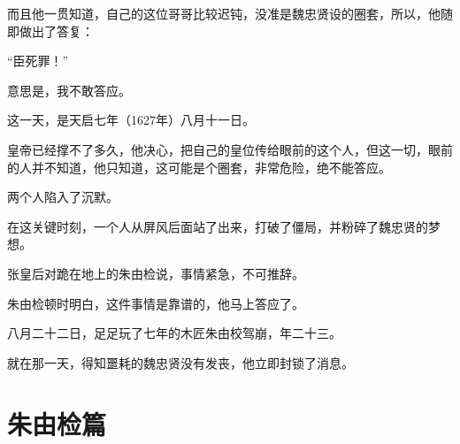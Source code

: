 \begin{multicols}{\theparacolNo}
		而且他一贯知道，自己的这位哥哥比较迟钝，没准是魏忠贤设的圈套，所以，他随即做出了答复：

		“臣死罪！”

		意思是，我不敢答应。

		这一天，是天启七年（1627年）八月十一日。

		皇帝已经撑不了多久，他决心，把自己的皇位传给眼前的这个人，但这一切，眼前的人并不知道，他只知道，这可能是个圈套，非常危险，绝不能答应。

		两个人陷入了沉默。

		在这关键时刻，一个人从屏风后面站了出来，打破了僵局，并粉碎了魏忠贤的梦想。

		张皇后对跪在地上的朱由检说，事情紧急，不可推辞。

		朱由检顿时明白，这件事情是靠谱的，他马上答应了。

		八月二十二日，足足玩了七年的木匠朱由校驾崩，年二十三。

		就在那一天，得知噩耗的魏忠贤没有发丧，他立即封锁了消息。
		\ifnum{}
	\end{multicols}
\fi
\newpage

\chapter*{朱由检篇}
